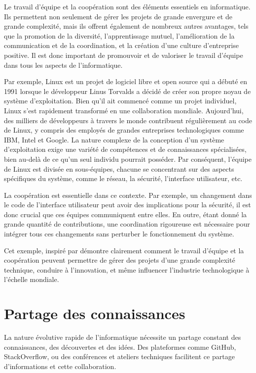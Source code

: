 Le travail d'équipe et la coopération sont des éléments essentiels en informatique. Ils permettent non seulement de gérer les projets de grande envergure et de grande complexité, mais ils offrent également de nombreux autres avantages, tels que la promotion de la diversité, l'apprentissage mutuel, l'amélioration de la communication et de la coordination, et la création d'une culture d'entreprise positive. Il est donc important de promouvoir et de valoriser le travail d'équipe dans tous les aspects de l'informatique.

Par exemple, Linux est un projet de logiciel libre et open source qui a débuté en 1991 lorsque le développeur Linus Torvalds a décidé de créer son propre noyau de système d'exploitation. Bien qu'il ait commencé comme un projet individuel, Linux s'est rapidement transformé en une collaboration mondiale. Aujourd'hui, des milliers de développeurs à travers le monde contribuent régulièrement au code de Linux, y compris des employés de grandes entreprises technologiques comme IBM, Intel et Google. La nature complexe de la conception d'un système d'exploitation exige une variété de compétences et de connaissances spécialisées, bien au-delà de ce qu'un seul individu pourrait posséder. Par conséquent, l'équipe de Linux est divisée en sous-équipes, chacune se concentrant sur des aspects spécifiques du système, comme le réseau, la sécurité, l'interface utilisateur, etc.

La coopération est essentielle dans ce contexte. Par exemple, un changement dans le code de l'interface utilisateur peut avoir des implications pour la sécurité, il est donc crucial que ces équipes communiquent entre elles. En outre, étant donné la grande quantité de contributions, une coordination rigoureuse est nécessaire pour intégrer tous ces changements sans perturber le fonctionnement du système.

Cet exemple, inspiré par \cite{torvalds2002just} démontre clairement comment le travail d'équipe et la coopération peuvent permettre de gérer des projets d'une grande complexité technique, conduire à l'innovation, et même influencer l'industrie technologique à l'échelle mondiale.

\section{Partage des connaissances} 
La nature évolutive rapide de l'informatique nécessite un partage constant des connaissances, des découvertes et des idées. Des plateformes comme GitHub, StackOverflow, ou des conférences et ateliers techniques facilitent ce partage d'informations et cette collaboration.

